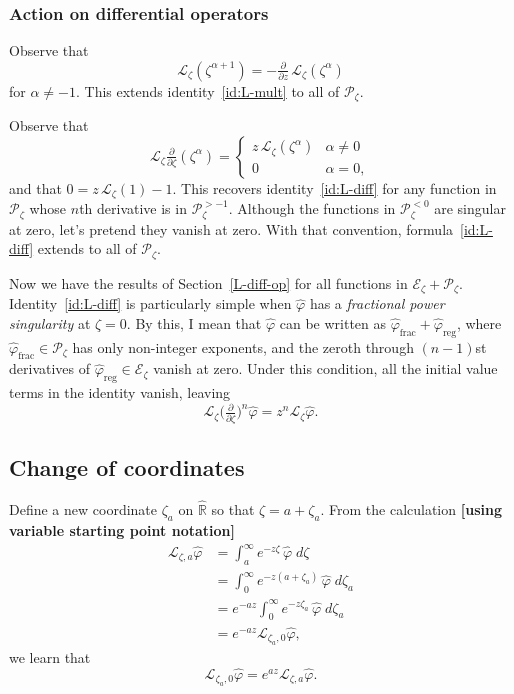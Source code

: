 \documentclass{article}
\newcommand{\R}{\mathbb{R}}
\newcommand{\laplace}{\mathcal{L}}
\begin{document}
\subsubsection{Action on differential operators}\label{L-diff-op-alg}
Observe that
\[ \laplace_\zeta(\zeta^{\alpha + 1}) = -\tfrac{\partial}{\partial z}\,\laplace_\zeta(\zeta^\alpha) \]
for $\alpha \neq -1$. This extends identity~\ref{id:L-mult} to all of $\mathcal{P}_\zeta$.

Observe that
\[ \laplace_\zeta\tfrac{\partial}{\partial \zeta}(\zeta^\alpha) = \begin{cases}
z\,\laplace_\zeta(\zeta^\alpha) & \alpha \neq 0 \\
0 & \alpha = 0,
\end{cases} \]
and that $0 = z\,\laplace_\zeta(1) - 1$. This recovers identity~\ref{id:L-diff} for any function in $\mathcal{P}_\zeta$ whose $n$th derivative is in $\mathcal{P}_\zeta^{> -1}$. Although the functions in $\mathcal{P}_\zeta^{< 0}$ are singular at zero, let's pretend they vanish at zero. With that convention, formula~\ref{id:L-diff} extends to all of $\mathcal{P}_\zeta$.

Now we have the results of Section~\ref{L-diff-op} for all functions in $\mathcal{E}_\zeta + \mathcal{P}_\zeta$. Identity~\ref{id:L-diff} is particularly simple when $\hat{\varphi}$ has a {\em fractional power singularity} at $\zeta = 0$. By this, I mean that $\hat{\varphi}$ can be written as $\hat{\varphi}_\text{frac} + \hat{\varphi}_\text{reg}$, where $\hat{\varphi}_\text{frac} \in \mathcal{P}_\zeta$ has only non-integer exponents, and the zeroth through $(n-1)$st derivatives of $\hat{\varphi}_\text{reg} \in \mathcal{E}_\zeta$ vanish at zero. Under this condition, all the initial value terms in the identity vanish, leaving
\[ \laplace_\zeta \big(\tfrac{\partial}{\partial \zeta}\big)^n \hat{\varphi} = z^n \laplace_\zeta \hat{\varphi}. \]
\subsection{Change of coordinates}
Define a new coordinate $\zeta_a$ on $\hat{\R}$ so that $\zeta = a + \zeta_a$. From the calculation \textbf{[using variable starting point notation]}
\begin{align*}
\laplace_{\zeta, a} \hat{\varphi} & = \int_a^\infty e^{-z \zeta}\,\hat{\varphi}\;d\zeta \\
& = \int_0^\infty e^{-z(a + \zeta_a)}\,\hat{\varphi}\;d\zeta_a \\
& = e^{-az} \int_0^\infty e^{-z\zeta_a}\,\hat{\varphi}\;d\zeta_a \\
& = e^{-az} \laplace_{\zeta_a, 0} \hat{\varphi},
\end{align*}
we learn that
\[ \laplace_{\zeta_a, 0} \hat{\varphi} = e^{az} \laplace_{\zeta, a} \hat{\varphi}. \]
\end{document}

